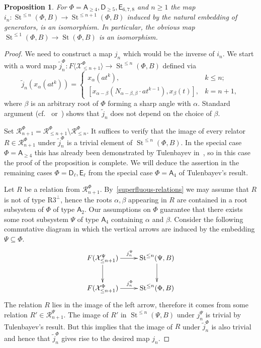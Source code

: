 \documentclass[oneside, 8pt]{amsart}
\newtheorem{prop}{Proposition}
\theoremstyle{remark}
\theoremstyle{definition}
\DeclareMathOperator{\St}{St}
\newcommand{\rA}{\mathsf{A}}
\newcommand{\rD}{\mathsf{D}}
\newcommand{\rE}{\mathsf{E}}
\numberwithin{equation}{section}
\begin{document}
\begin{prop} For $\Phi=\rA_{\geq 4}, \rD_{\geq 5}, \rE_{6,7,8}$ and $n \geq 1$ the map $i_n\colon \St^{\leq n}(\Phi, B) \to \St^{\leq n+1}(\Phi, B)$ induced by the natural embedding of generators, is an isomorphism. In particular, the obvious map $\St^{\leq 1}(\Phi, B) \to \St(\Phi, B)$ is an isomorphism. \end{prop}
\begin{proof}
 We need to construct a map $j_n$ which would be the inverse of $i_n$. 
 We start with a word map $\widetilde{j}_n^\Phi \colon F\langle \mathcal{X}^\Phi_{\leq n+1} \rangle \to \St^{\leq n}(\Phi, B)$ defined via
 \[ \widetilde{j}_n(x_\alpha(at^k)) = \begin{cases} x_\alpha(at^k), & k\leq n; \\
      [x_{\alpha - \beta} (N_{\alpha-\beta, \beta} \cdot at^{k-1}), x_{\beta}(t)], & k = n+1, \end{cases} \]
 where $\beta$ is an arbitrary root of $\Phi$ forming a sharp angle with $\alpha$.
 Standard argument (cf.~\cite[Proposition~1.1]{Re75} or~\cite[Proposition~3.2.2]{RS76}) shows that $\widetilde{j}_n$ does not depend on the choice of $\beta$.
 
 Set $\mathcal{R}^\Phi_{n+1} = \mathcal{R}^\Phi_{\leq n+1} \setminus \mathcal{R}^\Phi_{\leq n}$. It suffices to verify that the image of every relator $R \in \mathcal{R}^\Phi_{n+1}$ under $\widetilde{j}^\Phi_n$ is a trivial element of $\St^{\leq n}(\Phi, B)$. In the special case $\Phi=\rA_{\geq 4}$ this has already been demonstrated by Tulenbayev in~\cite[Lemma~3.3]{Tu83}, so in this case the proof of the proposition is complete. We will deduce the assertion in the remaining cases $\Phi=\rD_\ell,\rE_\ell$ from the special case $\Phi=\rA_4$ of Tulenbayev's result.
 
 Let $R$ be a relation from $\mathcal{R}^\Phi_{n+1}$. By~\cref{superfluous-relations} we may assume that $R$ is not of type $\text{R3}^\bot$, hence the roots $\alpha, \beta$ appearing in $R$ are contained in a root subsystem of $\Phi$ of type $\rA_2$. Our assumptions on $\Phi$ guarantee that there exists some root subsystem $\Psi$ of type $\rA_4$ containing $\alpha$ and $\beta$. Consider the following commutative diagram in which the vertical arrows are induced by the embedding $\Psi\subseteq\Phi$. 
  \begin{equation} \nonumber \xymatrix{
 F(\mathcal{X}_{\leq n+1}^\Psi) \ar[r]^{j_n^\Psi} \ar[d] & \St^{\leq n}(\Psi, B) \ar[d] \\
 F(\mathcal{X}_{\leq n+1}^\Phi) \ar[r]^{j_n^\Phi} & \St^{\leq n}(\Phi, B) }
 \end{equation}
The relation $R$ lies in the image of the left arrow, therefore it comes from some relation $R' \in \mathcal{R}^\Psi_{n+1}$. The image of $R'$ in $\St^{\leq n}(\Psi, B)$ under $j_n^\Psi$ is trivial by Tulenbayev's result. But this implies that the image of $R$ under $\widetilde{j}_n^\Phi$ is also trivial and hence that $\widetilde{j}_n^\Phi$ gives rise to the desired map $j_n$.
\end{proof}
\end{document}
